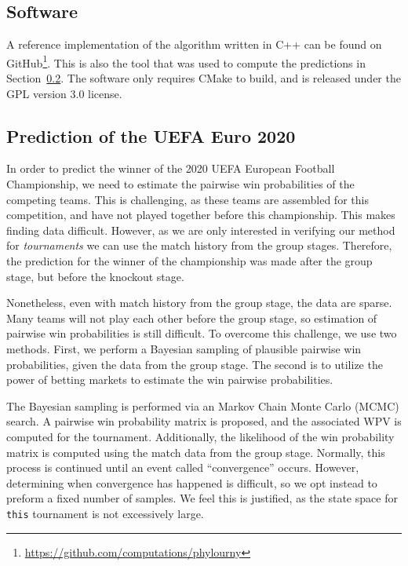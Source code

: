 \documentclass{article}
\begin{document}
\subsection{Software}

A reference implementation of the algorithm written in C++ can be found on
GitHub\footnote{\url{https://github.com/computations/phylourny}}. This is also the tool that was used to compute the
predictions in Section~\ref{sec:prediction}. The software only requires CMake to build, and is released under the GPL
version 3.0 license.

\subsection{Prediction of the UEFA Euro 2020}\label{sec:prediction}

In order to predict the winner of the 2020 UEFA European Football Championship, we need to estimate the pairwise win
probabilities of the competing teams. This is challenging, as these teams are assembled for this competition, and have
not played together before this championship. This makes finding data difficult. However, as we are only interested in
verifying our method for \textit{tournaments} we can use the match history from the group stages. Therefore, the
prediction for the winner of the championship was made after the group stage, but before the knockout stage.

Nonetheless, even with match history from the group stage, the data are sparse. Many teams will not play each other
before the group stage, so estimation of pairwise win probabilities is still difficult. To overcome this challenge, we
use two methods. First, we perform a Bayesian sampling of plausible pairwise win probabilities, given the data from the
group stage. The second is to utilize the power of betting markets to estimate the win pairwise probabilities.

The Bayesian sampling is performed via an Markov Chain Monte Carlo (MCMC) search. A pairwise win probability matrix is
proposed, and the associated WPV is computed for the tournament. Additionally, the likelihood of the win probability
matrix is computed using the match data from the group stage. Normally, this process is continued until an event called
``convergence'' occurs.  However, determining when convergence has happened is difficult, so we opt instead to preform a
fixed number of samples.  We feel this is justified, as the state space for \texttt{this} tournament is not excessively
large.
\end{document}

